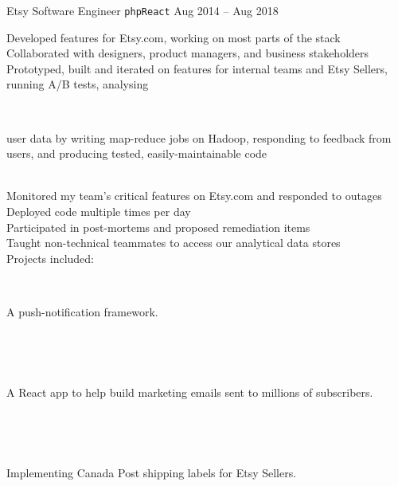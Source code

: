 \documentclass[9pt]{developercv} %
\begin{document}
\begin{entrylist}
{        }
    \entry
        {Etsy}
        {Software Engineer \hspace{1mm}\texttt{php}\slashsep\texttt{React}}
        {Aug 2014 -- Aug 2018}
        {
            Developed features for Etsy.com, working on most parts of the stack\\
            Collaborated with designers, product managers, and business stakeholders\\
            Prototyped, built and iterated on features for internal teams and Etsy Sellers, running A/B tests, analysing\\
                \begin{minipage}[t]{0.05\textwidth}\,\end{minipage}
                \begin{minipage}[t]{0.85\textwidth}user data by writing map-reduce jobs on Hadoop, responding to feedback from users, and producing tested, easily-maintainable code\end{minipage}\\
            Monitored my team's critical features on Etsy.com and responded to outages\\
            Deployed code multiple times per day\\
            Participated in post-mortems and proposed remediation items\\
            Taught non-technical teammates to access our analytical data stores\\
            Projects included:\\
            \begin{minipage}[t]{0.05\textwidth}\,\end{minipage}
            \begin{minipage}[t]{0.8\textwidth}A push-notification framework.\end{minipage}\\
            \begin{minipage}[t]{0.05\textwidth}\,\end{minipage}
            \begin{minipage}[t]{0.8\textwidth}A React app to help build marketing emails sent to millions of subscribers.\end{minipage}\\
            \begin{minipage}[t]{0.05\textwidth}\,\end{minipage}
            \begin{minipage}[t]{0.8\textwidth}Implementing Canada Post shipping labels for Etsy Sellers.\end{minipage}\\
}
\end{entrylist}
\end{document}
